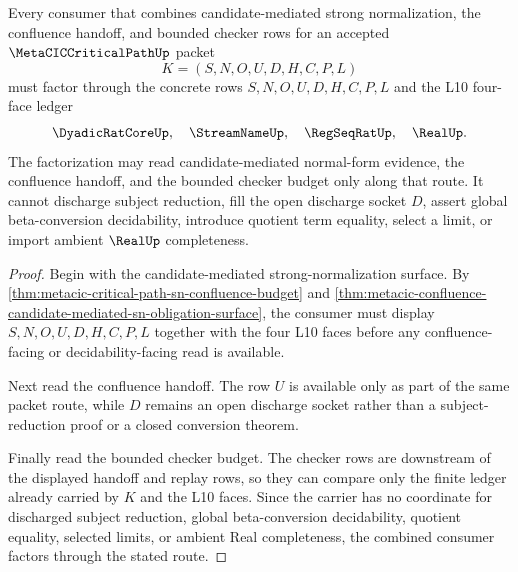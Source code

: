 \begin{theorem}
\label{thm:metacic-critical-path-candidate-sn-confluence-checker-factorization}
Every consumer that combines candidate-mediated strong normalization, the confluence handoff, and bounded checker rows for an accepted $\MetaCICCriticalPathUp$ packet
$$
K=(S,N,O,U,D,H,C,P,L)
$$
must factor through the concrete rows $S,N,O,U,D,H,C,P,L$ and the L10 four-face ledger
$$
\DyadicRatCoreUp,\quad \StreamNameUp,\quad \RegSeqRatUp,\quad \RealUp .
$$
The factorization may read candidate-mediated normal-form evidence, the confluence handoff, and the bounded checker budget only along that route. It cannot discharge subject reduction, fill the open discharge socket $D$, assert global beta-conversion decidability, introduce quotient term equality, select a limit, or import ambient $\RealUp$ completeness.
\end{theorem}
\begin{proof}
Begin with the candidate-mediated strong-normalization surface. By \autoref{thm:metacic-critical-path-sn-confluence-budget} and \autoref{thm:metacic-confluence-candidate-mediated-sn-obligation-surface}, the consumer must display $S,N,O,U,D,H,C,P,L$ together with the four L10 faces before any confluence-facing or decidability-facing read is available.

Next read the confluence handoff. The row $U$ is available only as part of the same packet route, while $D$ remains an open discharge socket rather than a subject-reduction proof or a closed conversion theorem.

Finally read the bounded checker budget. The checker rows are downstream of the displayed handoff and replay rows, so they can compare only the finite ledger already carried by $K$ and the L10 faces. Since the carrier has no coordinate for discharged subject reduction, global beta-conversion decidability, quotient equality, selected limits, or ambient Real completeness, the combined consumer factors through the stated route.
\end{proof}

